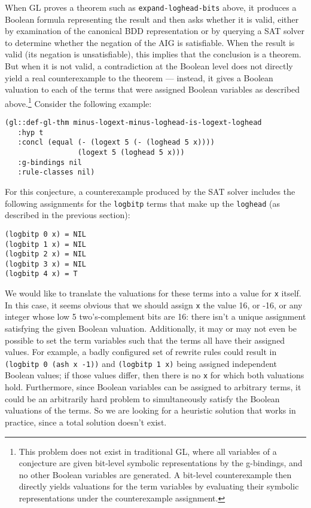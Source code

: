 \documentclass[submission,copyright,creativecommons]{eptcs}
\begin{document}
When GL proves a theorem such as \texttt{expand-loghead-bits} above,
it produces a Boolean formula representing the result and then asks
whether it is valid, either by examination of the canonical BDD
representation or by querying a SAT solver to determine whether the
negation of the AIG is satisfiable.  When the result is valid (its
negation is unsatisfiable), this implies that the conclusion is a
theorem.  But when it is not valid, a contradiction at the Boolean
level does not directly yield a real counterexample to the theorem ---
instead, it gives a Boolean valuation to each of the terms that were
assigned Boolean variables as described above.\footnote{This problem
  does not exist in traditional GL, where all variables of a
  conjecture are given bit-level symbolic representations by the
  g-bindings, and no other Boolean variables are generated.  A
  bit-level counterexample then directly yields valuations for the
  term variables by evaluating their symbolic representations under
  the counterexample assignment.}
Consider the following example:
\begin{verbatim}
(gl::def-gl-thm minus-logext-minus-loghead-is-logext-loghead
   :hyp t
   :concl (equal (- (logext 5 (- (loghead 5 x))))
                 (logext 5 (loghead 5 x)))
   :g-bindings nil
   :rule-classes nil)
\end{verbatim}
For this conjecture, a counterexample produced by the SAT solver
includes the following assignments for the \texttt{logbitp} terms that
make up the \texttt{loghead} (as described in the previous section):
\begin{verbatim}
(logbitp 0 x) = NIL
(logbitp 1 x) = NIL
(logbitp 2 x) = NIL
(logbitp 3 x) = NIL
(logbitp 4 x) = T
\end{verbatim}
We would
like to translate the valuations for these terms into a value for \texttt{x} itself.  In this
case, it seems obvious that we should assign \texttt{x} the value 16,
or -16, or any integer whose low 5 two's-complement bits are 16: there isn't a
unique assignment satisfying the given Boolean valuation.
Additionally, it may or may not even be possible to set the term
variables such that the terms all have their assigned values.  For
example, a badly configured set of rewrite rules could result in
\texttt{(logbitp 0 (ash x -1))} and \texttt{(logbitp 1 x)} being
assigned independent Boolean values; if those values differ, then
there is no \texttt{x} for which both valuations hold.  Furthermore, since
Boolean variables can be assigned to arbitrary terms, it could be an
arbitrarily hard problem to simultaneously satisfy the Boolean
valuations of the terms.  So we are looking for a heuristic solution
that works in practice, since a total solution doesn't exist.
\end{document}
